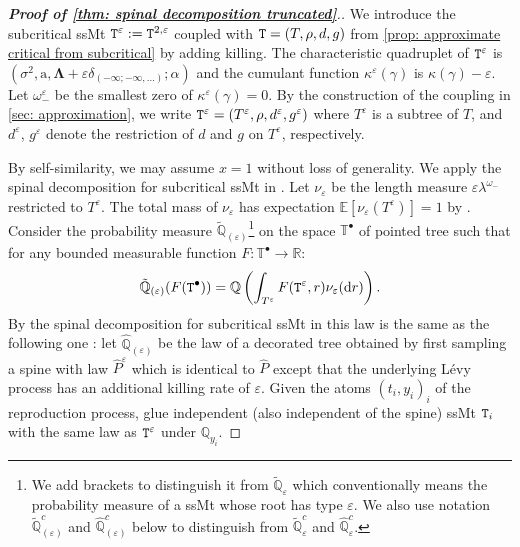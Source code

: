 \documentclass[12pt]{article}
\numberwithin{equation}{section}
\theoremstyle{plain}
\theoremstyle{definition}
\newcommand{\D}{\mathrm{d}}
\newcommand{\Bd}[1]{\boldsymbol{#1}}
\begin{document}
\begin{proof}[\textbf{Proof of \cref{thm: spinal decomposition truncated}}.]
We introduce the subcritical ssMt ${\tt T}^{\varepsilon}:= {\tt T}^{2, \varepsilon}$ coupled with ${\tt T} = (T, \rho, d, g)$ from \cref{prop: approximate critical from subcritical} by adding killing. The characteristic quadruplet of ${\tt T}^{\varepsilon}$ is  $(\sigma^2,\mathrm{a},\Bd{\Lambda}+\varepsilon\delta_{(-\infty;-\infty,\dots)};\alpha)$ and the cumulant function $\kappa^{\varepsilon}(\gamma)$ is $\kappa(\gamma)-\varepsilon$. Let $\omega_-^{\varepsilon}$ be the smallest zero of $\kappa^{\varepsilon}(\gamma) = 0$. By the construction of the coupling in \cref{sec: approximation}, we write ${\tt T}^{\varepsilon} = (T^{\varepsilon}, \rho, d^{\varepsilon}, g^\varepsilon)$ where $T^{\varepsilon}$ is a subtree of $T$, and $d^{\varepsilon}$, $g^{\varepsilon}$ denote the restriction of $d$ and $g$ on $T^{\varepsilon}$, respectively.


By self-similarity, we may assume $x=1$ without loss of generality. We apply the spinal decomposition for subcritical ssMt in \cite[Section 5]{BertoinJean2024SMta}. Let $\nu_{\varepsilon}$ be the length measure $\varepsilon\lambda^{\omega_-}$ restricted to $T^{\varepsilon}$. The total mass of $\nu_{\varepsilon}$ has expectation $\mathbb E[\nu_{\varepsilon}(T^{\varepsilon})]=1$ by \cite[(2.22)]{BertoinJean2024SMta}. Consider the probability measure $\tilde{\mathbb{Q}}_{(\varepsilon)}$\footnote{We add brackets to distinguish it from $\tilde{\mathbb{Q}}_{\varepsilon}$ which conventionally means the probability measure of a ssMt whose root has type $\varepsilon$. We also use notation $\tilde{\mathbb{Q}}^c_{(\varepsilon)}$ and $\hat{\mathbb{Q}}^c_{(\varepsilon)}$ below to distinguish from $\tilde{\mathbb{Q}}^c_{\varepsilon}$ and $\hat{\mathbb{Q}}^c_{\varepsilon}$.} on the space $\mathbb{T}^{\bullet}$ of pointed tree such that for any bounded measurable function $F:\mathbb{T}^{\bullet} \to \mathbb{R}$:
\begin{equation}\label{eq: size biase sub}
    \tilde{\mathbb{Q}}_{(\varepsilon)}(F({\tt T}^{\bullet}))= \mathbb Q\left(\int_{T^{\varepsilon}} F({\tt T}^{\varepsilon}, r)\nu_{\varepsilon}(\D r) \right).
\end{equation}
By the spinal decomposition for subcritical ssMt in \cite[Section 5]{BertoinJean2024SMta} this law is the same as the following one : let  $\hat{\mathbb{Q}}_{(\varepsilon)}$ be the law of a decorated tree obtained by first sampling a spine with law $\hat{P}^{\varepsilon}$ which is identical to $\hat{P}$ except that the underlying L\'evy process has an additional killing rate of $\varepsilon$. Given the atoms $(t_i, y_i)_i$ of the reproduction process, glue independent (also independent of the spine) ssMt ${\tt T}_i$ with the same law as ${\tt T}^{\varepsilon}$ under $\mathbb{Q}_{y_i}$.



\end{proof}
\end{document}

